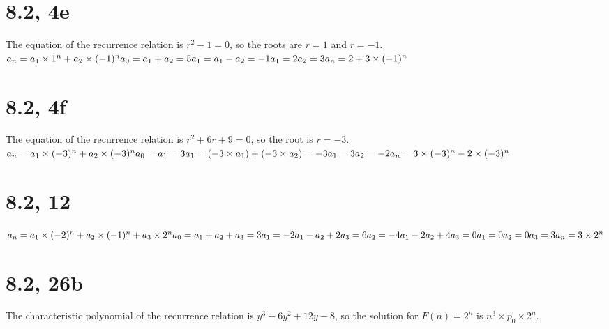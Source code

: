 \documentclass{article}
\begin{document}
\section{8.2, 4e}
The equation of the recurrence relation is $r^2 - 1 = 0$, so the roots are $r = 1$ and $r = -1$.
\newline
$a_n = a_1 \times 1^n + a_2 \times (-1)^n
\newline
a_0 = a_1 + a_2 = 5
\newline
a_1 = a_1 - a_2 = -1
\newline
a_1 = 2
\newline
a_2 = 3
\newline
a_n = 2 + 3 \times (-1)^n$

\section{8.2, 4f}
The equation of the recurrence relation is $r^2 + 6r + 9 = 0$, so the root is $r = -3$.
\newline
$a_n = a_1 \times (-3)^n + a_2 \times (-3)^n
\newline
a_0 = a_1 = 3
\newline
a_1 = (-3 \times a_1) + (-3 \times a_2) = -3
\newline
a_1 = 3
\newline
a_2 = -2
\newline
a_n = 3 \times (-3)^n - 2 \times (-3)^n$

\section{8.2, 12}
$a_n = a_1 \times (-2)^n + a_2 \times (-1)^n + a_3 \times 2^n
\newline
a_0 = a_1 + a_2 + a_3 = 3
\newline
a_1 = -2a_1 - a_2 + 2a_3 = 6
\newline
a_2 = -4a_1 - 2a_2 + 4a_3 = 0
\newline
a_1 = 0
\newline
a_2 = 0
\newline
a_3 = 3
\newline
a_n = 3 \times 2^n$

\section{8.2, 26b}
The characteristic polynomial of the recurrence relation is $y^3 - 6y^2 + 12y - 8$, so the solution for $F(n) = 2^n$ is $n^3 \times p_0 \times 2^n$.
\end{document}
